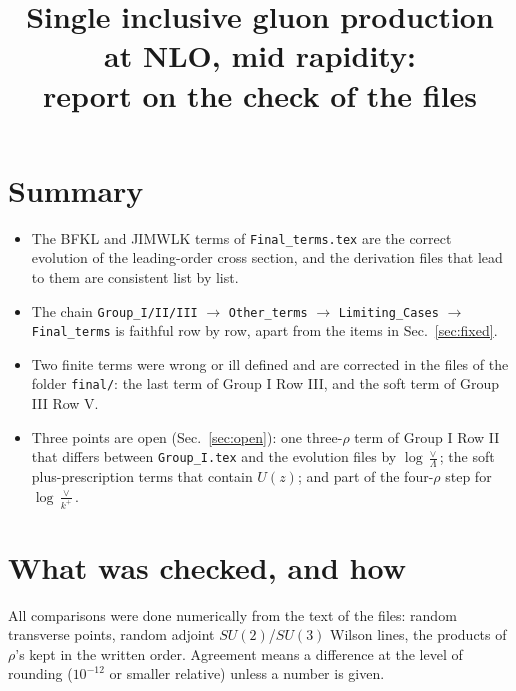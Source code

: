 \documentclass[10pt]{article}
\title{Single inclusive gluon production at NLO, mid rapidity:\\ report on the check of the files}
\author{}
\date{}
\newcommand{\LV}{\log\frac{\vee}{k^{+}}}
\begin{document}
\maketitle

\section{Summary}
\begin{itemize}
\item The BFKL and JIMWLK terms of \texttt{Final\_terms.tex} are the correct evolution of the leading-order cross section, and the derivation files that lead to them are consistent list by list.
\item The chain \texttt{Group\_I/II/III} $\to$ \texttt{Other\_terms} $\to$ \texttt{Limiting\_Cases} $\to$ \texttt{Final\_terms} is faithful row by row, apart from the items in Sec.~\ref{sec:fixed}.
\item Two finite terms were wrong or ill defined and are corrected in the files of the folder \texttt{final/}: the last term of Group I Row III, and the soft term of Group III Row V.
\item Three points are open (Sec.~\ref{sec:open}): one three-$\rho$ term of Group I Row II that differs between \texttt{Group\_I.tex} and the evolution files by $\log\frac{\vee}{\Lambda}$; the soft plus-prescription terms that contain $U(z)$; and part of the four-$\rho$ step for $\LV$.
\end{itemize}

\section{What was checked, and how}
All comparisons were done numerically from the text of the files: random transverse points, random adjoint $SU(2)$/$SU(3)$ Wilson lines, the products of $\rho$'s kept in the written order. Agreement means a difference at the level of rounding ($10^{-12}$ or smaller relative) unless a number is given.
\end{document}
